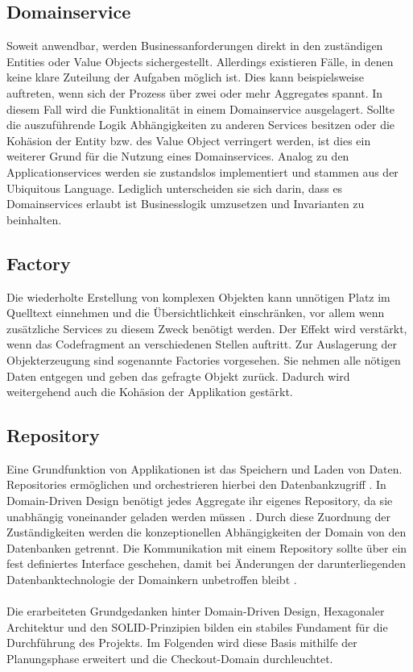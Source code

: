 \subsection{Domainservice}

Soweit anwendbar, werden Businessanforderungen direkt in den zuständigen Entities oder Value Objects sichergestellt. Allerdings existieren Fälle, in denen keine klare Zuteilung der Aufgaben möglich ist. Dies kann beispielsweise auftreten, wenn sich der Prozess über zwei oder mehr Aggregates spannt. In diesem Fall wird die Funktionalität in einem Domainservice ausgelagert. Sollte die auszuführende Logik Abhängigkeiten zu anderen Services besitzen oder die Kohäsion der Entity bzw. des Value Object verringert werden, ist dies ein weiterer Grund für die Nutzung eines Domainservices. Analog zu den Applicationservices werden sie zustandslos implementiert und stammen aus der Ubiquitous Language. Lediglich unterscheiden sie sich darin, dass es Domainservices erlaubt ist Businesslogik umzusetzen und Invarianten zu beinhalten. \cite[S. 268]{Vernon.2015}

\subsection{Factory}

Die wiederholte Erstellung von komplexen Objekten kann unnötigen Platz im Quelltext einnehmen und die Übersichtlichkeit einschränken, vor allem wenn zusätzliche Services zu diesem Zweck benötigt werden. Der Effekt wird verstärkt, wenn das Codefragment an verschiedenen Stellen auftritt. Zur Auslagerung der Objekterzeugung sind sogenannte Factories vorgesehen. Sie nehmen alle nötigen Daten entgegen und geben das gefragte Objekt zurück. Dadurch wird weitergehend auch die Kohäsion der Applikation gestärkt. \cite[S. 137f.]{Evans.2011}

\subsection{Repository}

Eine Grundfunktion von Applikationen ist das Speichern und Laden von Daten. Repositories ermöglichen und orchestrieren hierbei den Datenbankzugriff \cite[S. 151]{Evans.2011}. In Domain-Driven Design benötigt jedes Aggregate ihr eigenes Repository, da sie unabhängig voneinander geladen werden müssen \cite[S. 401]{Vernon.2015}. Durch diese Zuordnung der Zuständigkeiten werden die konzeptionellen Abhängigkeiten der Domain von den Datenbanken getrennt. Die Kommunikation mit einem Repository sollte über ein fest definiertes Interface geschehen, damit bei Änderungen der darunterliegenden Datenbanktechnologie der Domainkern unbetroffen bleibt \cite[S. 152]{Evans.2011}. \\\\



Die erarbeiteten Grundgedanken hinter Domain-Driven Design, Hexagonaler Architektur und den SOLID-Prinzipien bilden ein stabiles Fundament für die Durchführung des Projekts. Im Folgenden wird diese Basis mithilfe der Planungsphase erweitert und die Checkout-Domain durchleuchtet.

